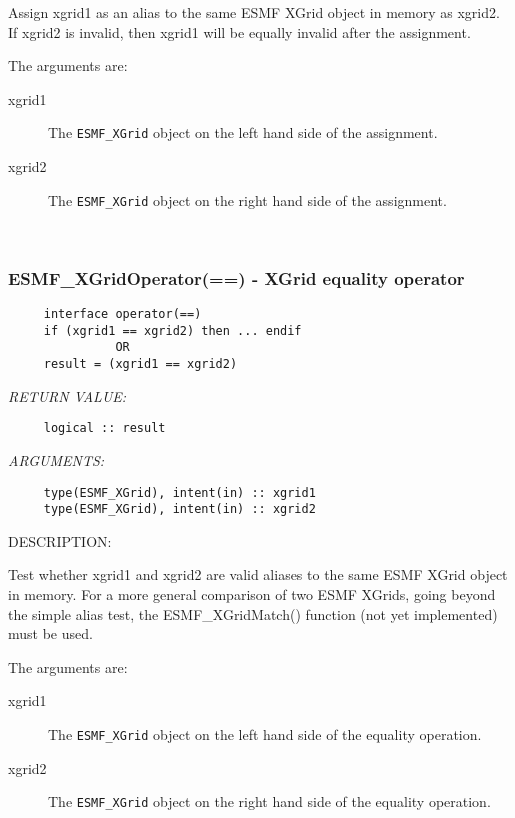      Assign xgrid1 as an alias to the same ESMF XGrid object in memory
     as xgrid2. If xgrid2 is invalid, then xgrid1 will be equally invalid after
     the assignment.
  
     The arguments are:
     \begin{description}
     \item[xgrid1]
       The {\tt ESMF\_XGrid} object on the left hand side of the assignment.
     \item[xgrid2]
       The {\tt ESMF\_XGrid} object on the right hand side of the assignment.
     \end{description}
   
 
\mbox{}\hrulefill\ 
 
\subsubsection [ESMF\_XGridOperator(==)] {ESMF\_XGridOperator(==) - XGrid equality operator}


  
\begin{verbatim}     interface operator(==)
     if (xgrid1 == xgrid2) then ... endif
               OR
     result = (xgrid1 == xgrid2)\end{verbatim}{\em RETURN VALUE:}
\begin{verbatim}     logical :: result\end{verbatim}{\em ARGUMENTS:}
\begin{verbatim}     type(ESMF_XGrid), intent(in) :: xgrid1
     type(ESMF_XGrid), intent(in) :: xgrid2\end{verbatim}
{\sf DESCRIPTION:\\ }


     Test whether xgrid1 and xgrid2 are valid aliases to the same ESMF
     XGrid object in memory. For a more general comparison of two ESMF XGrids,
     going beyond the simple alias test, the ESMF\_XGridMatch() function (not yet
     implemented) must be used.
  
     The arguments are:
     \begin{description}
     \item[xgrid1]
       The {\tt ESMF\_XGrid} object on the left hand side of the equality
       operation.
     \item[xgrid2]
       The {\tt ESMF\_XGrid} object on the right hand side of the equality
       operation.
     \end{description}
   
